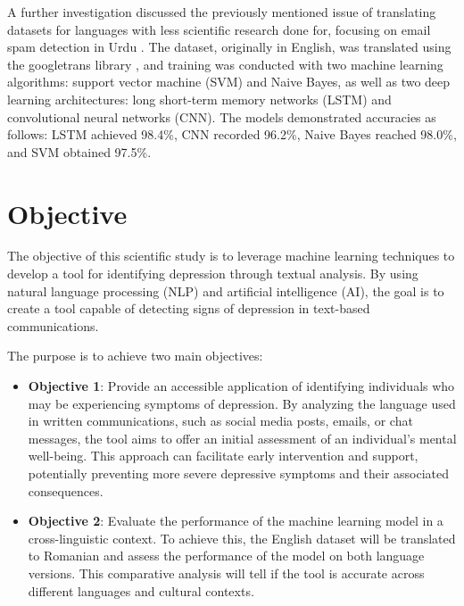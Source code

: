 A further investigation discussed the previously mentioned issue of translating datasets for languages with less scientific research done for, focusing on email spam detection in Urdu \cite{siddique2021machine}. The dataset, originally in English, was translated using the googletrans library \cite{googletranslib}, and training was conducted with two machine learning algorithms: support vector machine (SVM) and Naive Bayes, as well as two deep learning architectures: long short-term memory networks (LSTM) and convolutional neural networks (CNN). The models demonstrated accuracies as follows: LSTM achieved 98.4\%, CNN recorded 96.2\%, Naive Bayes reached 98.0\%, and SVM obtained 97.5\%.

\section{Objective}
\label{sec:ch1sec2}

\quad The objective of this scientific study is to leverage machine learning techniques to develop a tool for identifying depression through textual analysis. By using natural language processing (NLP) and artificial intelligence (AI), the goal is to create a tool capable of detecting signs of depression in text-based communications.

The purpose is to achieve two main objectives:
\begin{itemize}
     
\item \textbf{Objective 1}: Provide an accessible application of identifying individuals who may be experiencing symptoms of depression. By analyzing the language used in written communications, such as social media posts, emails, or chat messages, the tool aims to offer an initial assessment of an individual's mental well-being. This approach can facilitate early intervention and support, potentially preventing more severe depressive symptoms and their associated consequences.

\item \textbf{Objective 2}: Evaluate the performance of the machine learning model in a cross-linguistic context. To achieve this, the English dataset will be translated to Romanian and assess the performance of the model on both language versions. This comparative analysis will tell if the tool is accurate across different languages and cultural contexts.

\end{itemize}

